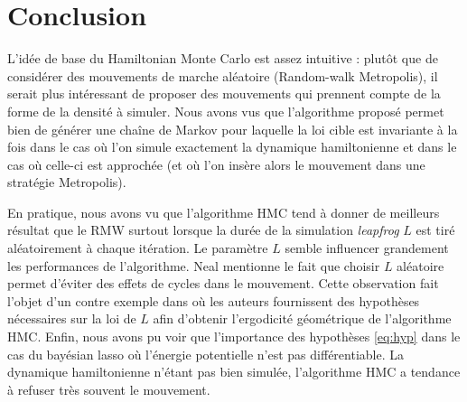 \documentclass[10pt,a4paper]{article}
\begin{document}
\section{Conclusion}
L'idée de base du Hamiltonian Monte Carlo est assez intuitive : plutôt que de considérer des mouvements de marche aléatoire (Random-walk Metropolis), il serait plus intéressant de proposer des mouvements qui prennent compte de la forme de la densité à simuler. Nous avons vus que l'algorithme proposé permet bien de générer une chaîne de Markov pour laquelle la loi cible est invariante à la fois dans le cas où l'on simule exactement la dynamique hamiltonienne et dans le cas où celle-ci est approchée (et où l'on insère alors le mouvement dans une stratégie Metropolis).

En pratique, nous avons vu que l'algorithme HMC tend à donner de meilleurs résultat que le RMW surtout lorsque la durée de la simulation {\it leapfrog} $L$ est tiré aléatoirement à chaque itération. Le paramètre $L$ semble influencer grandement les performances de l'algorithme. Neal \cite{Neal-hmc} mentionne le fait que choisir $L$ aléatoire permet d'éviter des effets de cycles dans le mouvement. Cette observation fait l'objet d'un contre exemple dans \cite{ergodicity-hmc} où les auteurs fournissent des hypothèses nécessaires sur la loi de $L$ afin d'obtenir l'ergodicité géométrique de l'algorithme HMC. Enfin, nous avons pu voir que l'importance des hypothèses \eqref{eq:hyp} dans le cas du bayésian lasso où l'énergie potentielle n'est pas différentiable. La dynamique hamiltonienne n'étant pas bien simulée, l'algorithme HMC a tendance à refuser très souvent le mouvement. 

\pagebreak


\end{document}
